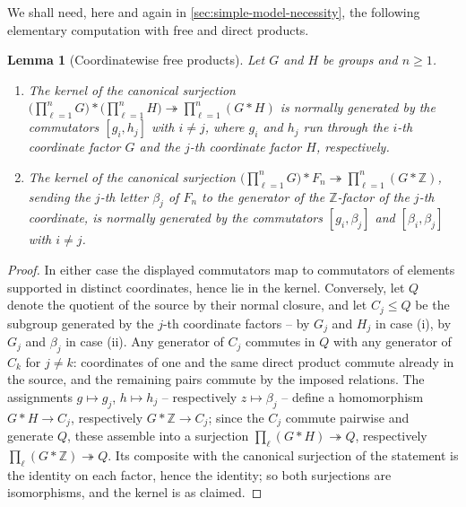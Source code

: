 \documentclass[reqno]{amsart}
\newtheorem{lemma}[theorem]{Lemma}
\theoremstyle{definition}
\newcommand{\Z}{\mathbb{Z}}
\numberwithin{equation}{section}
\begin{document}
We shall need, here and again in
\cref{sec:simple-model-necessity}, the following elementary
computation with free and direct products.

\begin{lemma}[Coordinatewise free products]
\label{lem:coordinatewise-kernel}
Let \(G\) and \(H\) be groups and \(n\geq1\).
\begin{enumerate}[label=\textup{(\roman*)},leftmargin=2.4em]
\item The kernel of the canonical surjection
      \(\bigl(\prod_{\ell=1}^nG\bigr)\ast
      \bigl(\prod_{\ell=1}^nH\bigr)
      \twoheadrightarrow\prod_{\ell=1}^n(G\ast H)\) is normally
      generated by the commutators \([g_i,h_j]\) with
      \(i\neq j\), where \(g_i\) and \(h_j\) run through the
      \(i\)-th coordinate factor \(G\) and the \(j\)-th
      coordinate factor \(H\), respectively.
\item The kernel of the canonical surjection
      \(\bigl(\prod_{\ell=1}^nG\bigr)\ast F_n
      \twoheadrightarrow\prod_{\ell=1}^n(G\ast\Z)\), sending
      the \(j\)-th letter \(\beta_j\) of \(F_n\) to the
      generator of the \(\Z\)-factor of the \(j\)-th
      coordinate, is normally generated by the commutators
      \([g_i,\beta_j]\) and \([\beta_i,\beta_j]\) with
      \(i\neq j\).
\end{enumerate}
\end{lemma}

\begin{proof}
In either case the displayed commutators map to commutators of
elements supported in distinct coordinates, hence lie in the
kernel. Conversely, let \(Q\) denote the quotient of the source
by their normal closure, and let \(C_j\leq Q\) be the subgroup
generated by the \(j\)-th coordinate factors -- by \(G_j\) and
\(H_j\) in case (i), by \(G_j\) and \(\beta_j\) in case (ii).
Any generator of \(C_j\) commutes in \(Q\) with any generator
of \(C_k\) for \(j\neq k\): coordinates of one and the same
direct product commute already in the source, and the remaining
pairs commute by the imposed relations. The assignments
\(g\mapsto g_j\), \(h\mapsto h_j\) -- respectively
\(z\mapsto\beta_j\) -- define a homomorphism
\(G\ast H\to C_j\), respectively \(G\ast\Z\to C_j\); since the
\(C_j\) commute pairwise and generate \(Q\), these assemble
into a surjection \(\prod_\ell(G\ast H)\twoheadrightarrow Q\),
respectively \(\prod_\ell(G\ast\Z)\twoheadrightarrow Q\). Its
composite with the canonical surjection of the statement is the
identity on each factor, hence the identity; so both
surjections are isomorphisms, and the kernel is as claimed.
\end{proof}
\end{document}
